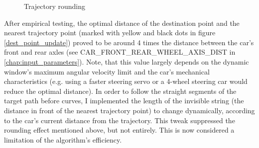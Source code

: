 \begin{figure}[!ht]
    \centering
    \caption{Trajectory rounding}
    \label{traj_rounding}
\end{figure}

After empirical testing, the optimal distance of the destination point and the nearest trajectory point (marked with yellow and black dots in figure \ref{dest_point_update}) proved to be around 4 times the distance between the car's front and rear axles (see CAR\_FRONT\_REAR\_WHEEL\_AXIS\_DIST in \ref{chap:input_parameters}). Note, that this value largely depends on the dynamic window's maximum angular velocity limit and the car's mechanical characteristics (e.g. using a faster steering servo or a 4-wheel steering car would reduce the optimal distance).
In order to follow the straight segments of the target path before curves, I implemented the length of the invisible string (the distance in front of the nearest trajectory point) to change dynamically, according to the car's current distance from the trajectory. This tweak suppressed the rounding effect mentioned above, but not entirely. This is now considered a limitation of the algorithm's efficiency.


